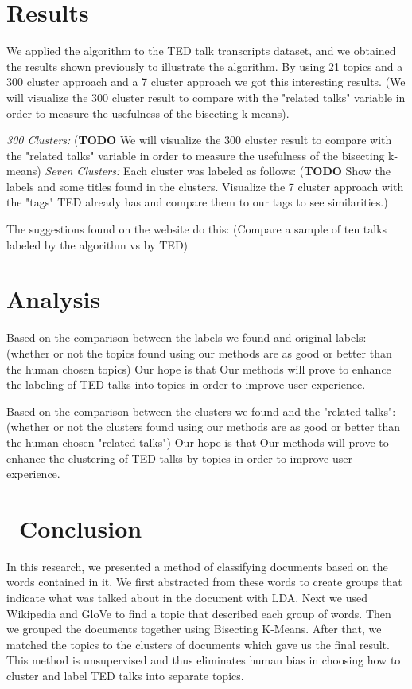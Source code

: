 \documentclass[letterpaper, 11pt]{article}
\begin{document}
    \section{Results}\label{results}

We applied the algorithm to the TED talk transcripts dataset, and we 
obtained the results shown previously to illustrate the algorithm. By using 21 topics and a 300 cluster approach and a 7 cluster approach we got this interesting results. (We will visualize the 300 cluster result to compare with the "related talks" variable in order to measure the usefulness of the bisecting k-means). 

\textit{300 Clusters:} (\textbf{TODO} We will visualize the 300 cluster result to compare with the "related talks" variable in order to measure the usefulness of the bisecting k-means)
\textit{Seven Clusters:} Each cluster was labeled as follows: (\textbf{TODO} Show the labels and some titles found in the clusters. Visualize the 7 cluster approach with the "tags" TED already has and compare them to our tags to see similarities.)

The suggestions found on the website do this: (Compare a sample of ten
talks labeled by the algorithm vs by TED)

    \section{Analysis}\label{analysis}

Based on the comparison between the labels we found and original labels: (whether or not the topics found using our methods are as good or better than the human chosen topics) Our hope is that Our methods will prove to enhance the labeling of TED talks into topics in order to improve user experience. 

Based on the comparison between the clusters we found and the "related talks": (whether or not the clusters found using our methods are as good or better than the human chosen "related talks") Our hope is that Our methods will prove to enhance the clustering of TED talks by topics in order to improve user experience. 

    \section{~Conclusion}\label{conclusion}

In this research, we presented a method of classifying documents based on the words contained in it. We first abstracted from these words to create groups that indicate what was talked about in the document with LDA. Next we used Wikipedia and GloVe to find a topic that described each group of words. Then we grouped the documents together using Bisecting K-Means. After that, we matched the topics to the clusters of documents which gave us the final result. This method is unsupervised and thus eliminates human bias in choosing how to cluster and label TED talks into separate topics. 
\end{document}

